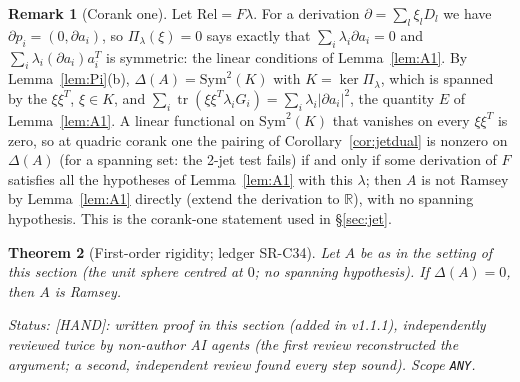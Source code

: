 \documentclass[11pt]{amsart}
\newcommand{\st}[1]{\textsf{[#1]}}
\newcommand{\R}{\mathbb{R}}
\theoremstyle{plain}
\newtheorem{theorem}{Theorem}[section]
\theoremstyle{definition}
\newtheorem{remark}[theorem]{Remark}
\begin{document}
\begin{remark}[Corank one]\label{rem:corankjet}
Let $\mathrm{Rel}=F\lambda$. For a derivation $\partial=\sum_l\xi_lD_l$ we have $\partial p_i=(0,\partial a_i)$,
so $\Pi_\lambda(\xi)=0$ says exactly that $\sum_i\lambda_i\partial a_i=0$ and
$\sum_i\lambda_i(\partial a_i)a_i^T$ is symmetric: the linear conditions of Lemma~\ref{lem:A1}. By
Lemma~\ref{lem:Pi}(b), $\Delta(A)=\mathrm{Sym}^2(K)$ with $K=\ker\Pi_\lambda$, which is spanned by the
$\xi\xi^T$, $\xi\in K$, and $\sum_i\operatorname{tr}(\xi\xi^T\lambda_iG_i)=\sum_i\lambda_i|\partial a_i|^2$, the quantity $E$ of Lemma~\ref{lem:A1}.
A linear functional on $\mathrm{Sym}^2(K)$ that vanishes on every $\xi\xi^T$ is zero, so at quadric corank
one the pairing of Corollary~\ref{cor:jetdual} is nonzero on $\Delta(A)$ (for a spanning set: the 2-jet test
fails) if and only if some derivation of $F$ satisfies all the hypotheses of Lemma~\ref{lem:A1} with this
$\lambda$; then $A$ is not Ramsey by Lemma~\ref{lem:A1} directly (extend the derivation to $\R$), with no
spanning hypothesis. This is the corank-one statement used in \S\ref{sec:jet}.
\end{remark}

\begin{theorem}[First-order rigidity; ledger SR-C34]\label{thm:rigidity}
Let $A$ be as in the setting of this section (the unit sphere centred at $0$; no spanning hypothesis). If
$\Delta(A)=0$, then $A$ is Ramsey.

\smallskip\noindent\emph{Status:} \st{HAND}: written proof in this section (added in v1.1.1),
independently reviewed twice by non-author AI agents (the first review reconstructed the argument; a
second, independent review found every step sound). Scope \texttt{ANY}.
\end{theorem}
\end{document}

